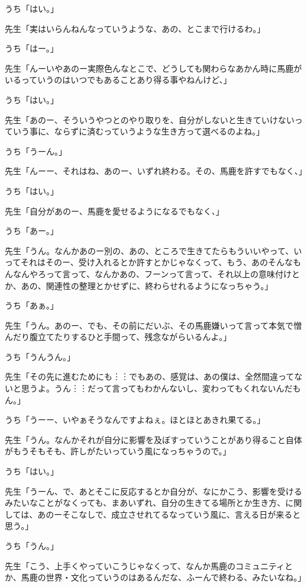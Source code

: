 \documentclass[b5j,twoside,twocolumn]{utarticle}
\begin{document}
\begin{description}
\item うち「はい。」
\item 先生「実はいらんねんなっていうような、あの、とこまで行けるわ。」
\item うち「はー。」
\item 先生「んーいやあのー実際色んなとこで、どうしても関わらなあかん時に馬鹿がいるっていうのはいつでもあることあり得る事やねんけど、」
\item うち「はい。」
\item 先生「あのー、そういうやつとのやり取りを、自分がしないと生きていけないっていう事に、ならずに済むっていうような生き方って選べるのよね。」
\item うち「うーん。」
\item 先生「んーー、それはね、あのー、いずれ終わる。その、馬鹿を許すでもなく、」
\item うち「はい。」
\item 先生「自分があのー、馬鹿を愛せるようになるでもなく、」
\item うち「あー。」
\item 先生「うん。なんかあのー別の、あの、ところで生きてたらもういいやって、いってそれはそのー、受け入れるとか許すとかじゃなくって、もう、あのそんなもんなんやろって言って、なんかあの、フーンって言って、それ以上の意味付けとか、あの、関連性の整理とかせずに、終わらせれるようになっちゃう。」
\item うち「あぁ。」
\item 先生「うん。あのー、でも、その前にだいぶ、その馬鹿嫌いって言って本気で憎んだり腹立てたりするひと手間って、残念ながらいるんよ。」
\item うち「うんうん。」
\item 先生「その先に進むためにも︙︙でもあの、感覚は、あの僕は、全然間違ってないと思うよ。うん︙︙だって言ってもわかんないし、変わってもくれないんだもん。」
\item うち「うーー、いやぁそうなんですよねぇ。ほとほとあきれ果てる。」
\item 先生「うん。なんかそれが自分に影響を及ぼすっていうことがあり得ること自体がもうそもそも、許しがたいっていう風になっちゃうので。」
\item うち「はい。」
\item 先生「うーん、で、あとそこに反応するとか自分が、なにかこう、影響を受けるみたいなことがなくっても、まあいずれ、自分の生きてる場所とか生き方、に関しては、あのーそこなしで、成立させれてるなっていう風に、言える日が来ると思う。」
\item うち「うん。」
\item 先生「こう、上手くやっていこうじゃなくって、なんか馬鹿のコミュニティとか、馬鹿の世界・文化っていうのはあるんだな、ふーんで終わる、みたいなね。」

\end{description}
\end{document}
